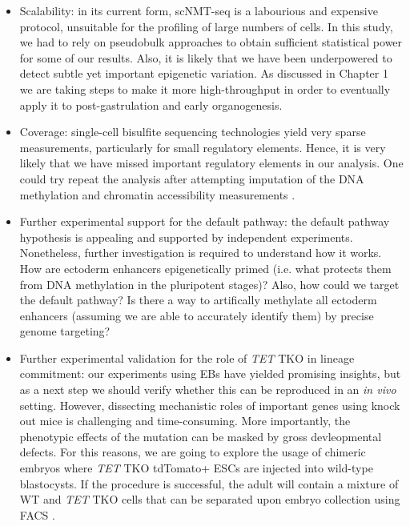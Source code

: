 \begin{itemize}
	\item Scalability: in its current form, scNMT-seq is a labourious and expensive protocol, unsuitable for the profiling of large numbers of cells. In this study, we had to rely on pseudobulk approaches to obtain sufficient statistical power for some of our results. Also, it is likely that we have been underpowered to detect subtle yet important epigenetic variation. As discussed in Chapter 1 we are taking steps to make it more high-throughput in order to eventually apply it to post-gastrulation and early organogenesis.

	\item Coverage: single-cell bisulfite sequencing technologies yield very sparse measurements, particularly for small regulatory elements. Hence, it is very likely that we have missed important regulatory elements in our analysis. One could try repeat the analysis after attempting imputation of the DNA methylation and chromatin accessibility measurements \cite{Angermueller2017}.

	\item Further experimental support for the default pathway: the default pathway hypothesis is appealing and supported by independent experiments. Nonetheless, further investigation is required to understand how it works. How are ectoderm enhancers epigenetically primed (i.e. what protects them from DNA methylation in the pluripotent stages)? Also, how could we target the default pathway? Is there a way to artifically methylate all ectoderm enhancers (assuming we are able to accurately identify them) by precise genome targeting?

	\item Further experimental validation for the role of \textit{TET} TKO in lineage commitment: our experiments using EBs have yielded promising insights, but as a next step we should verify whether this can be reproduced in an \textit{in vivo} setting. However, dissecting mechanistic roles of important genes using knock out mice is challenging and time-consuming. More importantly, the phenotypic effects of the mutation can be masked by gross devleopmental defects. For this reasons, we are going to explore the usage of chimeric embryos where \textit{TET} TKO tdTomato+ ESCs are injected into wild-type blastocysts. If the procedure is successful, the adult will contain a mixture of WT and \textit{TET} TKO cells that can be separated upon embryo collection using FACS \cite{PijuanSala2019}.

\end{itemize}
